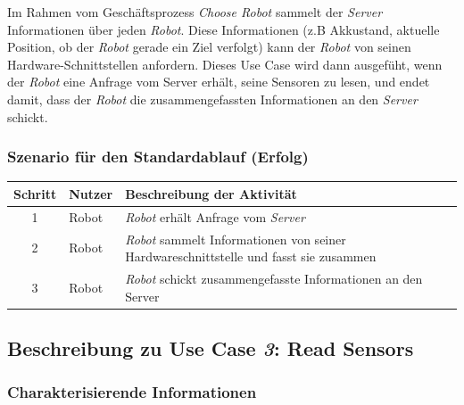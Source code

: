 \documentclass[includeheaders]{scrartcl}
\begin{document}
			Im Rahmen vom Geschäftsprozess \emph{Choose Robot} sammelt der \emph{Server}
			Informationen über jeden \emph{Robot}. Diese Informationen (z.B
			Akkustand, aktuelle Position, ob der \emph{Robot} gerade ein Ziel verfolgt)
			kann der \emph{Robot} von seinen Hardware-Schnittstellen anfordern. Dieses
			Use Case wird dann ausgefüht, wenn der \emph{Robot} eine Anfrage vom
			Server erhält, seine Sensoren zu lesen, und endet damit, dass der \emph{Robot}
			die zusammengefassten Informationen an den \emph{Server} schickt.

			\subsubsection*{Szenario für den Standardablauf (Erfolg)}

			\begin{table}[H]
				\centering
				\begin{tabularx}{\textwidth}{@{}cp{2cm}X@{}}
				\toprule
				Schritt & Nutzer & Beschreibung der Aktivität \\ \midrule
				1 & Robot & \emph{Robot} erhält Anfrage vom \emph{Server} \\
				2 & Robot & \emph{Robot} sammelt Informationen von seiner Hardwareschnittstelle und fasst sie zusammen \\
				3 & Robot & \emph{Robot} schickt zusammengefasste Informationen an den Server \\
				\bottomrule
				\end{tabularx}
			\end{table}


		\subsection{Beschreibung zu Use Case \emph{3}: Read Sensors}

			\subsubsection*{Charakterisierende Informationen}
\end{document}
